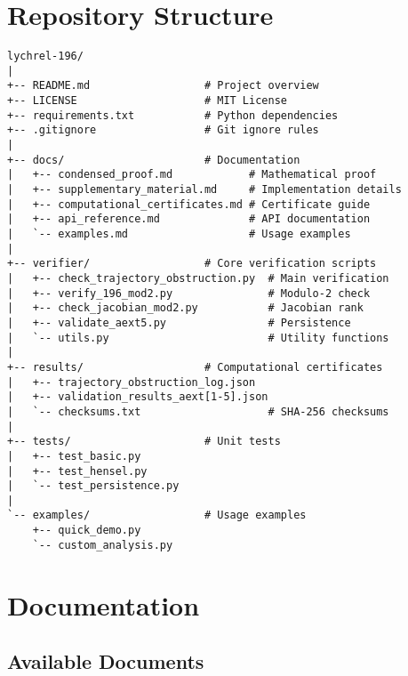 \documentclass[11pt,a4paper]{article}
\begin{document}
\section{Repository Structure}

\begin{lstlisting}[style=bashstyle, caption={Project Directory Structure}]
lychrel-196/
|
+-- README.md                  # Project overview
+-- LICENSE                    # MIT License
+-- requirements.txt           # Python dependencies
+-- .gitignore                 # Git ignore rules
|
+-- docs/                      # Documentation
|   +-- condensed_proof.md            # Mathematical proof
|   +-- supplementary_material.md     # Implementation details
|   +-- computational_certificates.md # Certificate guide
|   +-- api_reference.md              # API documentation
|   `-- examples.md                   # Usage examples
|
+-- verifier/                  # Core verification scripts
|   +-- check_trajectory_obstruction.py  # Main verification
|   +-- verify_196_mod2.py               # Modulo-2 check
|   +-- check_jacobian_mod2.py           # Jacobian rank
|   +-- validate_aext5.py                # Persistence
|   `-- utils.py                         # Utility functions
|
+-- results/                   # Computational certificates
|   +-- trajectory_obstruction_log.json
|   +-- validation_results_aext[1-5].json
|   `-- checksums.txt                    # SHA-256 checksums
|
+-- tests/                     # Unit tests
|   +-- test_basic.py
|   +-- test_hensel.py
|   `-- test_persistence.py
|
`-- examples/                  # Usage examples
    +-- quick_demo.py
    `-- custom_analysis.py
\end{lstlisting}

\section{Documentation}

\subsection{Available Documents}
\end{document}
